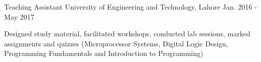 \begin{cventries}
	\cventry
	{Teaching Assistant}
	{University of Engineering and Technology, Lahore}
	{}%
	{Jan. 2016 - May 2017}
	{
		\begin{cvitems}
			\item {Designed study material, facilitated workshops, conducted lab sessions, marked assignments and quizzes (Microprocessor Systems, Digital Logic Design, Programming Fundamentals and Introduction to Programming)}	
		\end{cvitems}
	}

\end{cventries}
